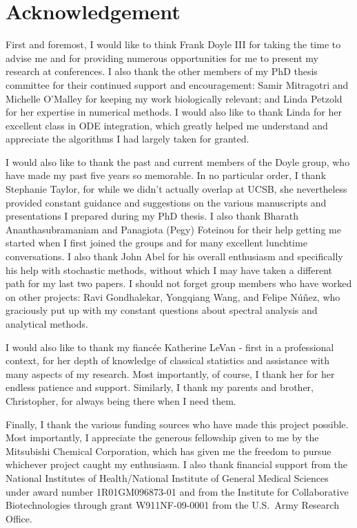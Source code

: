 \chapter*{Acknowledgement}

{

First and foremost, I would like to think Frank Doyle III for taking the time to advise me and for providing numerous opportunities for me to present my research at conferences.
I also thank the other members of my PhD thesis committee for their continued support and encouragement: Samir Mitragotri and Michelle O'Malley for keeping my work biologically relevant; and Linda Petzold for her expertise in numerical methods.
I would also like to thank Linda for her excellent class in ODE integration, which greatly helped me understand and appreciate the algorithms I had largely taken for granted.

I would also like to thank the past and current members of the Doyle group, who have made my past five years so memorable.
In no particular order, I thank Stephanie Taylor, for while we didn't actually overlap at UCSB, she nevertheless provided constant guidance and suggestions on the various manuscripts and presentations I prepared during my PhD thesis.
I also thank Bharath Ananthasubramaniam and Panagiota (Pegy) Foteinou for their help getting me started when I first joined the groups and for many excellent lunchtime conversations.
I also thank John Abel for his overall enthusiasm and specifically his help with stochastic methods, without which I may have taken a different path for my last two papers.
I should not forget group members who have worked on other projects: Ravi Gondhalekar, Yongqiang Wang, and Felipe N\'{u}\~{n}ez, who graciously put up with my constant questions about spectral analysis and analytical methods.

I would also like to thank my fianc\'{e}e Katherine LeVan - first in a professional context, for her depth of knowledge of classical statistics and assistance with many aspects of my research.
Most importantly, of course, I thank her for her endless patience and support. 
Similarly, I thank my parents and brother, Christopher, for always being there when I need them.

Finally, I thank the various funding sources who have made this project possible.
Most importantly, I appreciate the generous fellowship given to me by the Mitsubishi Chemical Corporation, which has given me the freedom to pursue whichever project caught my enthusiasm.
I also thank financial support from the National Institutes of Health/National Institute of General Medical Sciences under award number 1R01GM096873-01 and from the Institute for Collaborative Biotechnologies through grant W911NF-09-0001 from the U.S.\ Army Research Office.

}



